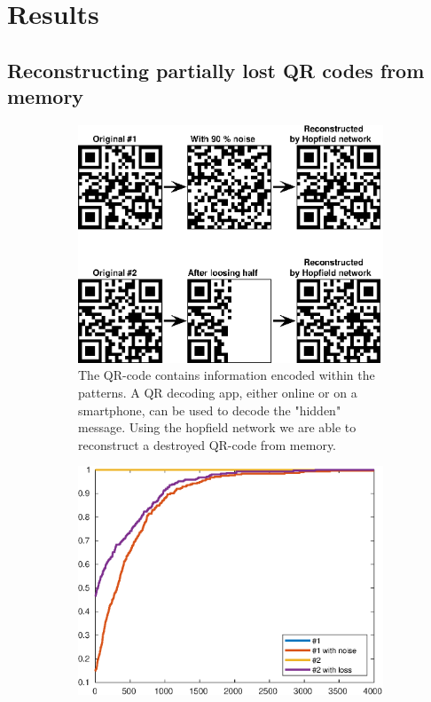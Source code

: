 \section{Results}

\subsection{Reconstructing partially lost QR codes from memory}
\begin{figure}[H]
    \centering
    \begin{subfigure}{0.49\textwidth}
        \includegraphics[width=\textwidth]{figs/qr-code}
        \caption{The QR-code contains information encoded within the patterns. A QR decoding app, either online or on a smartphone, can be used to decode the "hidden" message. Using the hopfield network we are able to reconstruct a destroyed QR-code from memory.}
    \end{subfigure}
    \begin{subfigure}{0.49\textwidth}
        \includegraphics[width=\textwidth]{figs/qr-code-sim}

\end{subfigure}
\end{figure}
